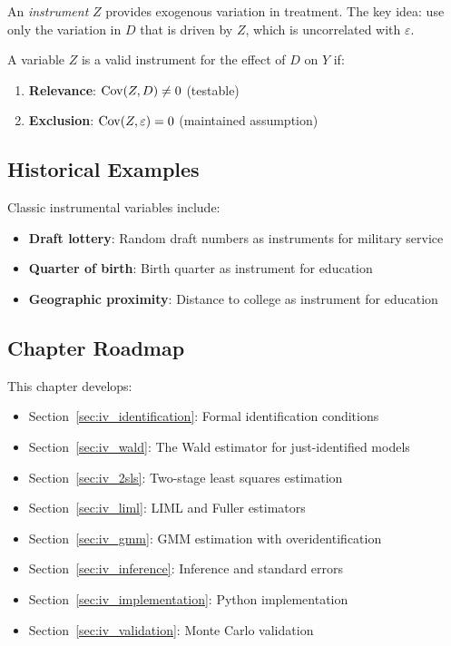 An \emph{instrument} $Z$ provides exogenous variation in treatment. The key idea: use only the variation in $D$ that is driven by $Z$, which is uncorrelated with $\varepsilon$.

\begin{definition}
\label{def:instrument}
A variable $Z$ is a valid instrument for the effect of $D$ on $Y$ if:
\begin{enumerate}
    \item \textbf{Relevance}: $\mathrm{Cov}(Z, D) \neq 0$ (testable)
    \item \textbf{Exclusion}: $\mathrm{Cov}(Z, \varepsilon) = 0$ (maintained assumption)
\end{enumerate}
\end{definition}

\subsection{Historical Examples}

Classic instrumental variables include:
\begin{itemize}
    \item \textbf{Draft lottery}: Random draft numbers as instruments for military service
    \item \textbf{Quarter of birth}: Birth quarter as instrument for education \cite{angrist1991draft}
    \item \textbf{Geographic proximity}: Distance to college as instrument for education
\end{itemize}

\subsection{Chapter Roadmap}

This chapter develops:
\begin{itemize}
    \item Section~\ref{sec:iv_identification}: Formal identification conditions
    \item Section~\ref{sec:iv_wald}: The Wald estimator for just-identified models
    \item Section~\ref{sec:iv_2sls}: Two-stage least squares estimation
    \item Section~\ref{sec:iv_liml}: LIML and Fuller estimators
    \item Section~\ref{sec:iv_gmm}: GMM estimation with overidentification
    \item Section~\ref{sec:iv_inference}: Inference and standard errors
    \item Section~\ref{sec:iv_implementation}: Python implementation
    \item Section~\ref{sec:iv_validation}: Monte Carlo validation
\end{itemize}


